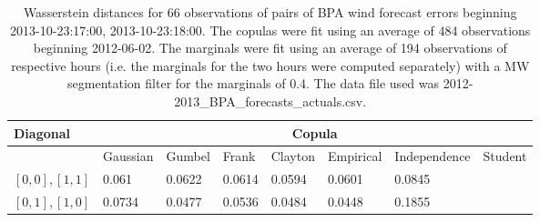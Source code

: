 \begin{table}[h] 
    \centering 
    \begin{tabular}{|l|l|l|l|l|l|l|l|} \hline 
        \textbf{Diagonal} & \multicolumn{7}{c|}{\textbf{Copula}} \\ \hline 
        & Gaussian & Gumbel & Frank & Clayton & Empirical & Independence & Student \\ \hline 
        $[0,0], [1,1]$ & 0.061 & 0.0622 & 0.0614 & 0.0594 & 0.0601 & 0.0845 &  \\ \hline 
        $[0,1], [1,0]$ & 0.0734 & 0.0477 & 0.0536 & 0.0484 & 0.0448 & 0.1855 &  \\ \hline 
    \end{tabular} 
    \caption{Wasserstein distances for 66 observations of pairs of BPA wind forecast errors beginning 2013-10-23:17:00, 2013-10-23:18:00. The copulas were fit  using an average of 484 observations beginning 2012-06-02. The marginals were fit using an average of 194 observations of respective hours (i.e. the  marginals for the two hours were computed separately) with a MW segmentation filter for the marginals of 0.4. The data file used was 2012-2013\_BPA\_forecasts\_actuals.csv.} 
\end{table}